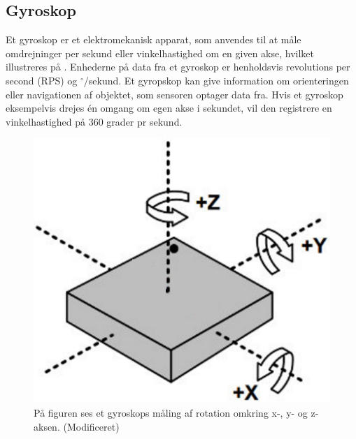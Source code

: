 \subsection{Gyroskop}
Et gyroskop er et elektromekanisk apparat, som anvendes til at måle omdrejninger per sekund eller vinkelhastighed om en given akse, hvilket illustreres på . Enhederne på data fra et gyroskop er henholdsvis revolutions per second (RPS) og $^\circ$/sekund. \newline
Et gyropskop kan give information om orienteringen eller navigationen af objektet, som sensoren optager data fra. Hvis et gyroskop eksempelvis drejes én omgang om egen akse i sekundet, vil den registrere en vinkelhastighed på 360 grader pr sekund. \citep{Sparkfun_gyro,Barbour2014}
\begin{figure}[H]
	\centering
	\includegraphics[scale=0.8]{figures/bProblemloesning/gyro.png}
	\caption{På figuren ses et gyroskops måling af rotation omkring x-, y- og z-aksen. \citep{Sparkfun_gyro} (Modificeret)}
	\label{fig:gyro}
\end{figure}

